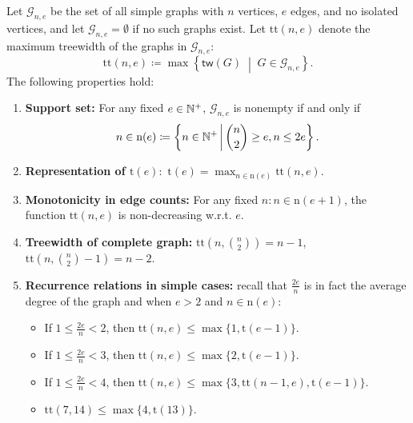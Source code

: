 \documentclass[letterpaper,11pt]{article}
\newcommand{\treewidthp}[1]{\mathsf{tw}(#1)}
\newcommand{\graphset}{\mathcal{G}}
\newcommand{\graphsetne}[2]{\graphset_{#1,#2}}
\begin{document}
\begin{bibunit}[plainnat]
\begin{lemma}
\label{lem:property_of_tt}
Let $\graphsetne{n}{e}$ be the set of all simple graphs with $n$ vertices, $e$ edges, and no isolated vertices, and let $\graphsetne{n}{e} = \emptyset$ if no such graphs exist. Let $\mathrm{tt}(n, e)$ denote the maximum treewidth of the graphs in $\graphsetne{n}{e}$:
\begin{equation*}
\mathrm{tt}(n, e) \coloneqq \max\left\{ \treewidthp{G}\;\middle|\; G \in \graphsetne{n}{e} \right\}.
\end{equation*}
The following properties hold:
\begin{enumerate}
    \item \textbf{Support set:} For any fixed $e \in \mathbb{N}^+ $, $\graphsetne{n}{e}$ is nonempty if and only if 
    \begin{equation*}
        n \in \mathrm{n}(e) \coloneqq \left\{ n \in \mathbb{N}^+ \, \middle \vert\,  \binom{n}{2} \geq e,  n \leq 2e \right\}.
    \end{equation*}
    \item \textbf{Representation of $\mathrm{t}(e): $} $ \mathrm{t}(e) = \max_{n \in \mathrm{n}(e)} \mathrm{tt} (n, e).$
    \item \textbf{Monotonicity in edge counts:} For any fixed $n: n \in \mathrm{n}(e+1) $, the function $\mathrm{tt}(n, e)$ is non-decreasing w.r.t. $e$.
    \item \textbf{Treewidth of complete graph:} $\mathrm{tt}(n, \binom{n}{2}) =  n - 1$, $\mathrm{tt}(n, \binom{n}{2} - 1) = n - 2$.
    \item \textbf{Recurrence relations in simple cases:}  recall that $\frac{2e}{n}$ is in fact the average degree of the graph and when $e > 2$ and $n \in \mathrm{n} (e)$:
    \begin{itemize}
        \item[(1)] If $1 \leq \frac{2e}{n} < 2$, then $ \mathrm{tt}(n,e) \leq \max\{ 1, \mathrm{t}(e-1) \}$.
        \item[(2)] If $1 \leq \frac{2e}{n} < 3$, then $ \mathrm{tt}(n,e)  \leq \max\{ 2, \mathrm{t}(e-1) \} $.
        \item[(3)] If $1 \leq \frac{2e}{n} < 4$, then $ \mathrm{tt}(n,e)  \leq \max\{ 3, \mathrm{tt}(n - 1 ,e), \mathrm{t}(e-1) \}$.
        \item[(4)] $ \mathrm{tt}(7,14) \leq  \max\{ 4,  \mathrm{t}(13) \}$.
    \end{itemize}
\end{enumerate}
\end{lemma}


\end{bibunit}
\end{document}

